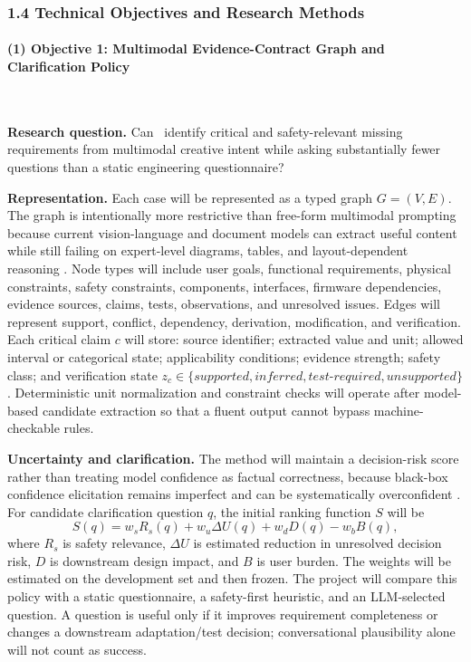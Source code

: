 \documentclass[11pt,letterpaper]{article}
\begin{document}
\subsubsection*{1.4 Technical Objectives and Research Methods}

\paragraph{(1) Objective 1: Multimodal Evidence-Contract Graph and Clarification Policy}~{}

\textbf{Research question.} Can \VibeFab\ identify critical and safety-relevant missing requirements from multimodal creative intent while asking substantially fewer questions than a static engineering questionnaire?

\textbf{Representation.} Each case will be represented as a typed graph $G=(V,E)$. The graph is intentionally more restrictive than free-form multimodal prompting because current vision-language and document models can extract useful content while still failing on expert-level diagrams, tables, and layout-dependent reasoning \cite{liu2023llava,li2023blip2,yue2024mmmu,blecher2024nougat,peng2025dochmet}. Node types will include user goals, functional requirements, physical constraints, safety constraints, components, interfaces, firmware dependencies, evidence sources, claims, tests, observations, and unresolved issues. Edges will represent support, conflict, dependency, derivation, modification, and verification. Each critical claim $c$ will store: source identifier; extracted value and unit; allowed interval or categorical state; applicability conditions; evidence strength; safety class; and verification state $z_c\in\{supported, inferred, test\mbox{-}required, unsupported\}$. Deterministic unit normalization and constraint checks will operate after model-based candidate extraction so that a fluent output cannot bypass machine-checkable rules.

\textbf{Uncertainty and clarification.} The method will maintain a decision-risk score rather than treating model confidence as factual correctness, because black-box confidence elicitation remains imperfect and can be systematically overconfident \cite{xiong2024uncertainty}. For candidate clarification question $q$, the initial ranking function $S$ will be
\[
S(q)=w_sR_s(q)+w_u\Delta U(q)+w_dD(q)-w_bB(q),
\]
where $R_s$ is safety relevance, $\Delta U$ is estimated reduction in unresolved decision risk, $D$ is downstream design impact, and $B$ is user burden. The weights will be estimated on the development set and then frozen. The project will compare this policy with a static questionnaire, a safety-first heuristic, and an LLM-selected question. A question is useful only if it improves requirement completeness or changes a downstream adaptation/test decision; conversational plausibility alone will not count as success.
\end{document}
